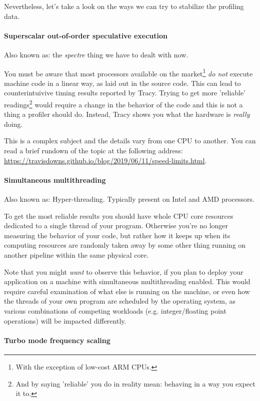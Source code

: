 \documentclass[hidelinks,titlepage,a4paper]{article}
\begin{document}
Nevertheless, let's take a look on the ways we can try to stabilize the profiling data.

\paragraph{Superscalar out-of-order speculative execution}

Also known as: the \emph{spectre} thing we have to dealt with now.

You must be aware that most processors available on the market\footnote{With the exception of low-cost ARM CPUs.} \emph{do not} execute machine code in a linear way, as laid out in the source code. This can lead to counterintuivive timing results reported by Tracy. Trying to get more 'reliable' readings\footnote{And by saying 'reliable' you do in reality mean: behaving in a way you expect it to.} would require a change in the behavior of the code and this is not a thing a profiler should do. Instead, Tracy shows you what the hardware is \emph{really} doing.

This is a complex subject and the details vary from one CPU to another. You can read a brief rundown of the topic at the following address: \url{https://travisdowns.github.io/blog/2019/06/11/speed-limits.html}.

\paragraph{Simultaneous multithreading}

Also known as: Hyper-threading. Typically present on Intel and AMD processors.

To get the most reliable results you should have whole CPU core resources dedicated to a single thread of your program. Otherwise you're no longer measuring the behavior of your code, but rather how it keeps up when its computing resources are randomly taken away by some other thing running on another pipeline within the same physical core.

Note that you might \emph{want} to observe this behavior, if you plan to deploy your application on a machine with simultaneous multithreading enabled. This would require careful examination of what else is running on the machine, or even how the threads of your own program are scheduled by the operating system, as various combinations of competing workloads (e.g. integer/floating point operations) will be impacted differently.

\paragraph{Turbo mode frequency scaling}
\end{document}
